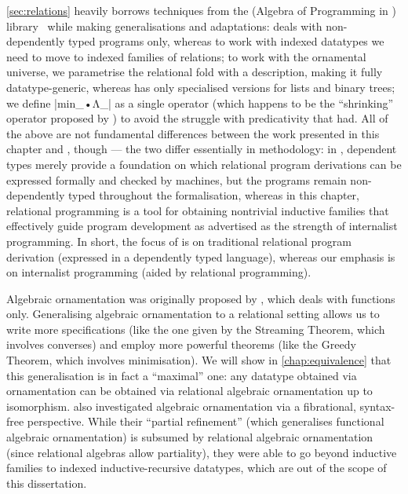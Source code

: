 \autoref{sec:relations} heavily borrows techniques from the  (Algebra of Programming in \Agda) library~\citep{Mu-AoPA} while making generalisations and adaptations:
 deals with non-dependently typed programs only, whereas to work with indexed datatypes we need to move to indexed families of relations; to work with the ornamental universe, we parametrise the relational fold with a description, making it fully datatype-generic, whereas  has only specialised versions for lists and binary trees; we define |min_•Λ_| as a single operator (which happens to be the ``shrinking'' operator proposed by \citet{Mu-Galois}) to avoid the struggle with predicativity that  had.
All of the above are not fundamental differences between the work presented in this chapter and , though --- the two differ essentially in methodology: in , dependent types merely provide a foundation on which relational program derivations can be expressed formally and checked by machines, but the programs remain non-dependently typed throughout the formalisation, whereas in this chapter, relational programming is a tool for obtaining nontrivial inductive families that effectively guide program development as advertised as the strength of internalist programming.
In short, the focus of  is on traditional relational program derivation (expressed in a dependently typed language), whereas our emphasis is on internalist programming (aided by relational programming).

Algebraic ornamentation was originally proposed by \citet{McBride-ornaments}, which deals with functions only.
Generalising algebraic ornamentation to a relational setting allows us to write more specifications (like the one given by the Streaming Theorem, which involves converses) and employ more powerful theorems (like the Greedy Theorem, which involves minimisation).
We will show in \autoref{chap:equivalence} that this generalisation is in fact a ``maximal'' one: any datatype obtained via ornamentation can be obtained via relational algebraic ornamentation up to isomorphism.
\citet{Atkey-refining-inductive-types} also investigated algebraic ornamentation via a fibrational, syntax-free perspective.
While their ``partial refinement'' (which generalises functional algebraic ornamentation) is subsumed by relational algebraic ornamentation (since relational algebras allow partiality), they were able to go beyond inductive families to indexed inductive-recursive datatypes, which are out of the scope of this dissertation.

